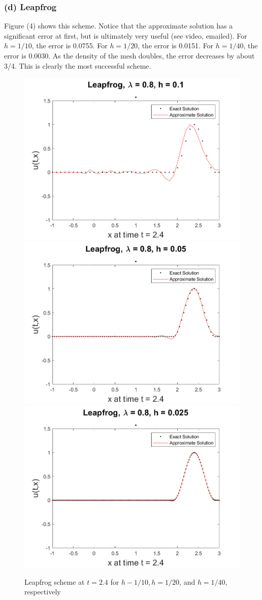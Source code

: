 \documentclass[12pt]{article}
\begin{document}
\subsubsection*{(d) Leapfrog}

Figure (4) shows this scheme. Notice that the approximate solution has a significant error at first, but is ultimately very useful (see video, emailed). For $h=1/10$, the error is 0.0755. For $h=1/20$, the error is 0.0151. For $h=1/40$, the error is 0.0030. As the density of the mesh doubles, the error decreases by about 3/4. This is clearly the most successful scheme.

\begin{figure}
	\centering
	\includegraphics[width=.6\linewidth]{./code/d_leapfrog_1_10th.png}	\includegraphics[width=.6\linewidth]{./code/d_leapfrog_1_20th.png}
	\includegraphics[width=.6\linewidth]{./code/d_leapfrog_1_40th.png}
	\caption{Leapfrog scheme at $t=2.4$ for $h-1/10, h=1/20$, and $h=1/40$, respectively}
\end{figure}
\end{document}
